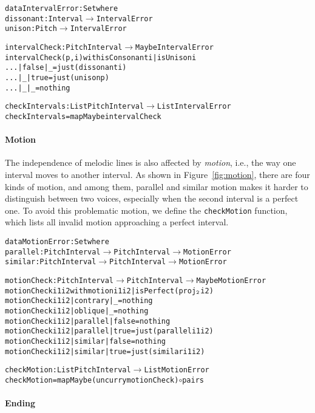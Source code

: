 \begin{alltt}
data IntervalError : Set where
  dissonant : Interval \(\rightarrow\) IntervalError
  unison    : Pitch \(\rightarrow\) IntervalError

intervalCheck : PitchInterval \(\rightarrow\) Maybe IntervalError
intervalCheck (p , i) with isConsonant i | isUnison i
... | false | _    = just (dissonant i)
... | _     | true = just (unison p)
... | _     | _    = nothing

checkIntervals : List PitchInterval \(\rightarrow\) List IntervalError
checkIntervals = mapMaybe intervalCheck
\end{alltt}

\paragraph{Motion}

The independence of melodic lines is also affected by \emph{motion},
i.e., the way one interval moves to another interval.
As shown in Figure~\ref{fig:motion}, there are four kinds of motion,
and among them, parallel and similar motion makes it harder to
distinguish between two voices, especially when the second interval
is a perfect one.
To avoid this problematic motion, we define the \texttt{checkMotion}
function, which lists all invalid motion approaching a perfect interval.

\begin{alltt}
data MotionError : Set where
  parallel : PitchInterval \(\rightarrow\) PitchInterval \(\rightarrow\) MotionError
  similar  : PitchInterval \(\rightarrow\) PitchInterval \(\rightarrow\) MotionError

motionCheck : PitchInterval \(\rightarrow\) PitchInterval \(\rightarrow\) Maybe MotionError
motionCheck i1 i2 with motion i1 i2 | isPerfect (proj\(\sb{\mathtt{2}}\) i2)
motionCheck i1 i2 | contrary | \_     = nothing
motionCheck i1 i2 | oblique  | \_     = nothing
motionCheck i1 i2 | parallel | false = nothing
motionCheck i1 i2 | parallel | true  = just (parallel i1 i2)
motionCheck i1 i2 | similar  | false = nothing
motionCheck i1 i2 | similar  | true  = just (similar i1 i2)

checkMotion : List PitchInterval \(\rightarrow\) List MotionError
checkMotion = mapMaybe (uncurry motionCheck) \(\circ\) pairs  
\end{alltt}

\paragraph{Ending}

